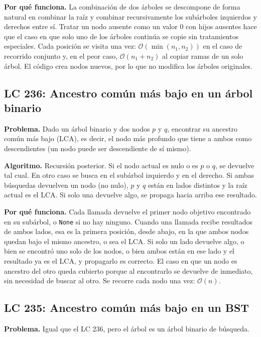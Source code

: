 \documentclass[11pt,letterpaper]{article}
\newcommand{\bigO}[1]{\ensuremath{\mathcal{O}(#1)}}
\begin{document}
\textbf{Por qué funciona.} La combinación de dos árboles se descompone de forma natural en combinar la raíz y combinar recursivamente los subárboles izquierdos y derechos entre sí. Tratar un nodo ausente como un valor 0 con hijos ausentes hace que el caso en que solo uno de los árboles continúa se copie sin tratamientos especiales. Cada posición se visita una vez: \bigO{\min(n_1, n_2)} en el caso de recorrido conjunto y, en el peor caso, \bigO{n_1 + n_2} al copiar ramas de un solo árbol. El código crea nodos nuevos, por lo que no modifica los árboles originales.

\subsection{LC 236: Ancestro común más bajo en un árbol binario}

\textbf{Problema.} Dado un árbol binario y dos nodos $p$ y $q$, encontrar su ancestro común más bajo (LCA), es decir, el nodo más profundo que tiene a ambos como descendientes (un nodo puede ser descendiente de sí mismo).

\textbf{Algoritmo.} Recursión posterior. Si el nodo actual es nulo o es $p$ o $q$, se devuelve tal cual. En otro caso se busca en el subárbol izquierdo y en el derecho. Si ambas búsquedas devuelven un nodo (no nulo), $p$ y $q$ están en lados distintos y la raíz actual es el LCA. Si solo una devuelve algo, se propaga hacia arriba ese resultado.

\textbf{Por qué funciona.} Cada llamada devuelve el primer nodo objetivo encontrado en su subárbol, o \texttt{None} si no hay ninguno. Cuando una llamada recibe resultados de ambos lados, esa es la primera posición, desde abajo, en la que ambos nodos quedan bajo el mismo ancestro, o sea el LCA. Si solo un lado devuelve algo, o bien se encontró uno solo de los nodos, o bien ambos están en ese lado y el resultado ya es el LCA, y propagarlo es correcto. El caso en que un nodo es ancestro del otro queda cubierto porque al encontrarlo se devuelve de inmediato, sin necesidad de buscar al otro. Se recorre cada nodo una vez: \bigO{n}.

\subsection{LC 235: Ancestro común más bajo en un BST}

\textbf{Problema.} Igual que el LC 236, pero el árbol es un árbol binario de búsqueda.
\end{document}

